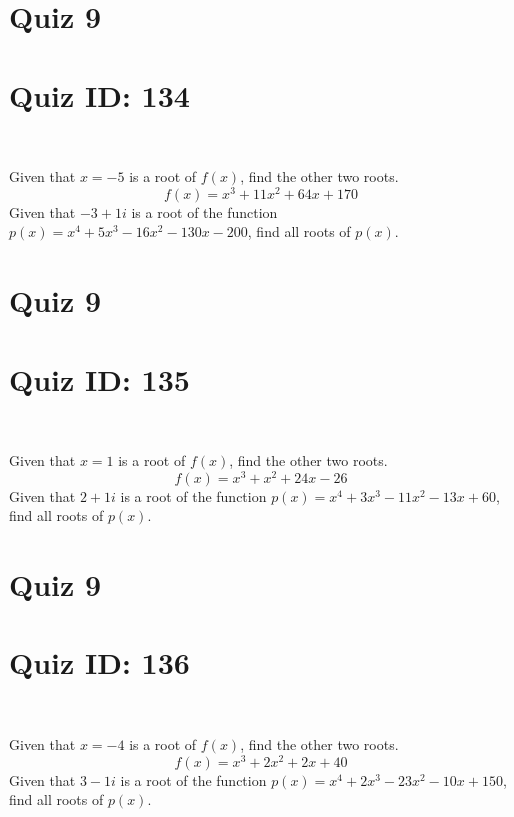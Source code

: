\documentclass{exam}
\begin{document}
\section*{Quiz 9}
\section*{Quiz ID: 134}
\vspace{0.5cm}\
\vspace{1cm}\
\begin{questions}
\question Given that $x=-5$ is a root of $f(x)$, find the other two roots.\[f(x)=
x^3 + 11x^2 + 64x + 170\]
\newpage
\question Given that $-3+1\mathit{i}$ is a root of the function $p(x)=
x^4 + 5x^3 - 16x^2 - 130x - 200$, find all roots of $p(x)$. 
\end{questions}\newpage
\newpage
\section*{Quiz 9}
\section*{Quiz ID: 135}
\vspace{0.5cm}\
\vspace{1cm}\
\begin{questions}
\question Given that $x=1$ is a root of $f(x)$, find the other two roots.\[f(x)=
x^3 + x^2 + 24x - 26\]
\newpage
\question Given that $2+1\mathit{i}$ is a root of the function $p(x)=
x^4 + 3x^3 - 11x^2 - 13x + 60$, find all roots of $p(x)$. \makeemptybox{\stretch{1}}
\end{questions}\newpage
\newpage
\section*{Quiz 9}
\section*{Quiz ID: 136}
\vspace{0.5cm}\
\vspace{1cm}\
\begin{questions}
\question Given that $x=-4$ is a root of $f(x)$, find the other two roots.\[f(x)=
x^3 + 2x^2 + 2x + 40\]
\newpage
\question Given that $3-1\mathit{i}$ is a root of the function $p(x)=
x^4 + 2x^3 - 23x^2 - 10x + 150$, find all roots of $p(x)$. \makeemptybox{\stretch{1}}
\end{questions}\newpage
\newpage
\end{document}
